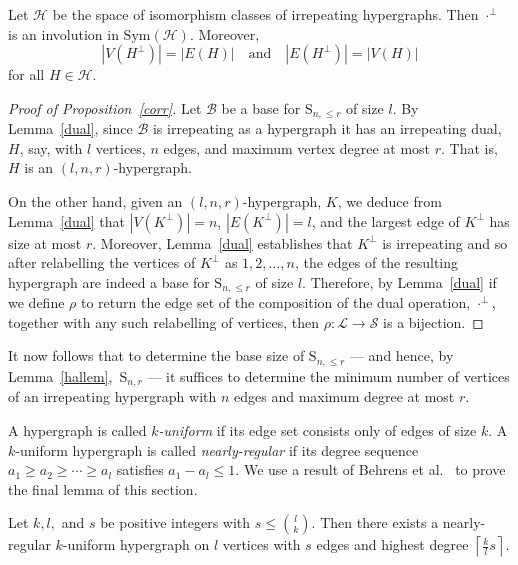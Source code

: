 \documentclass[ALCO,published]{cedram}
\renewcommand\S{\mathrm{S}}
\begin{document}
\begin{lemma}\label{dual}
Let $\mathcal{H}$ be the space of isomorphism classes of irrepeating hypergraphs. Then $\cdot^\perp$ is an involution in $\mathrm{Sym}(\mathcal{H})$. Moreover, $$|V(H^\perp)|=|E(H)|\quad\text{and}\quad|E(H^\perp)|=|V(H)|$$ for all $H\in\mathcal{H}$.
\end{lemma}

\begin{proof}[Proof of Proposition~\ref{corr}]
Let $\mathcal{B}$ be a base for $\S_{n,\leq r}$ of size $l$. By Lemma~\ref{dual}, since $\mathcal{B}$ is irrepeating as a hypergraph it has an irrepeating dual, $H$, say, with $l$ vertices, $n$ edges, and maximum vertex degree at most $r$. That is, $H$ is an $(l,n,r)$-hypergraph. 

On the other hand, given an $(l,n,r)$-hypergraph, $K$, we deduce from Lemma~\ref{dual} that $|V(K^\perp)|=n$, $|E(K^\perp)|=l$, and the largest edge of $K^\perp$ has size at most $r$. Moreover, Lemma~\ref{dual} establishes that $K^\perp$ is irrepeating and so after relabelling the vertices of $K^\perp$ as $1,2,\dots,n$, the edges of the resulting hypergraph are indeed a base for $\S_{n,\leq r}$ of size $l$. Therefore, by Lemma~\ref{dual} if we define $\rho$ to return the edge set of the composition of the dual operation, $\cdot^\perp$, together with any such relabelling of vertices, then $\rho:\mathcal{L}\to\mathcal{S}$ is a bijection.
\end{proof}

It now follows that to determine the base size of $\S_{n,\leq r}$ --- and hence, by Lemma~\ref{hallem},~$\S_{n,r}$ --- it suffices to determine the minimum number of vertices of an irrepeating hypergraph with $n$ edges and maximum degree at most $r$. 

A hypergraph is called \emph{$k$-uniform} if its edge set consists only of edges of size $k$. A $k$-uniform hypergraph is called \emph{nearly-regular} if its degree sequence $a_1\geq a_2\geq\cdots\geq a_l$ satisfies $a_1-a_l\leq 1$. We use a result of Behrens et al.~\cite{beh} to prove the final lemma of this section.

\begin{lemma}\label{kexist}
Let $k,l,$ and $s$ be positive integers with $s\leq\binom{l}{k}$. Then there exists a nearly-regular $k$-uniform hypergraph on $l$ vertices with $s$ edges and highest degree $\left\lceil\frac{k}{l}s\right\rceil$.
\end{lemma}
\end{document}
